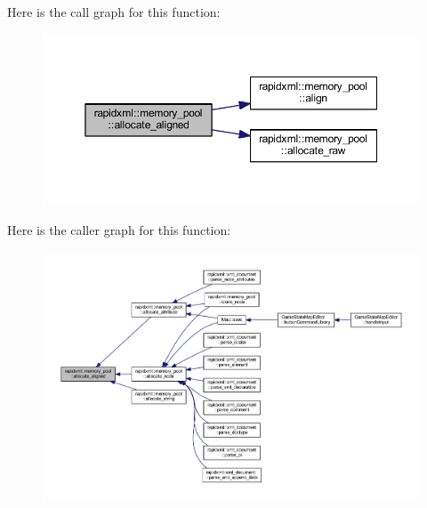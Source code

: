 Here is the call graph for this function\+:
\nopagebreak
\begin{figure}[H]
\begin{center}
\leavevmode
\includegraphics[width=350pt]{classrapidxml_1_1memory__pool_a4e9cf53fa5f9da3a8f31b754bd94b4ec_cgraph}
\end{center}
\end{figure}




Here is the caller graph for this function\+:
\nopagebreak
\begin{figure}[H]
\begin{center}
\leavevmode
\includegraphics[width=350pt]{classrapidxml_1_1memory__pool_a4e9cf53fa5f9da3a8f31b754bd94b4ec_icgraph}
\end{center}
\end{figure}


